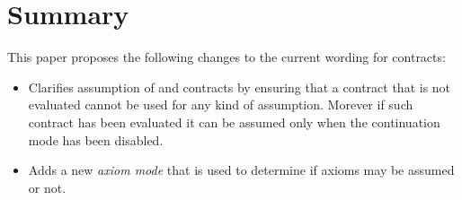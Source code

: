 \section{Summary}

This paper proposes the following changes to the current wording for contracts:

\begin{itemize}

\item Clarifies assumption of  and  contracts by
ensuring that a contract that is not evaluated cannot be used for any kind of
assumption. Morever if such contract has been evaluated it can be assumed only
when the continuation mode has been disabled.

\item Adds a new \emph{axiom mode} that is used to determine if axioms may be
assumed or not.

\end{itemize}
